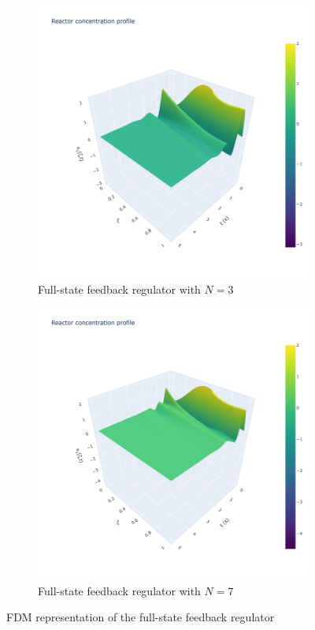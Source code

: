 \begin{figure}[!htbp]
    \centering
    \begin{subfigure}[b]{0.45\textwidth}
        \includegraphics[width=\textwidth]{Figures/3D_x1_k3.png}
        \caption{Full-state feedback regulator with $N=3$}
        \label{fig:3D_x1_k3}
    \end{subfigure}
    \hfill
    \begin{subfigure}[b]{0.45\textwidth}
        \includegraphics[width=\textwidth]{Figures/3D_x1_k7.png}
        \caption{Full-state feedback regulator with $N=7$}
        \label{fig:3D_x1_k7}
    \end{subfigure}
    \caption{FDM representation of the full-state feedback regulator}
    \label{fig:full_state_feedback}
\end{figure}

